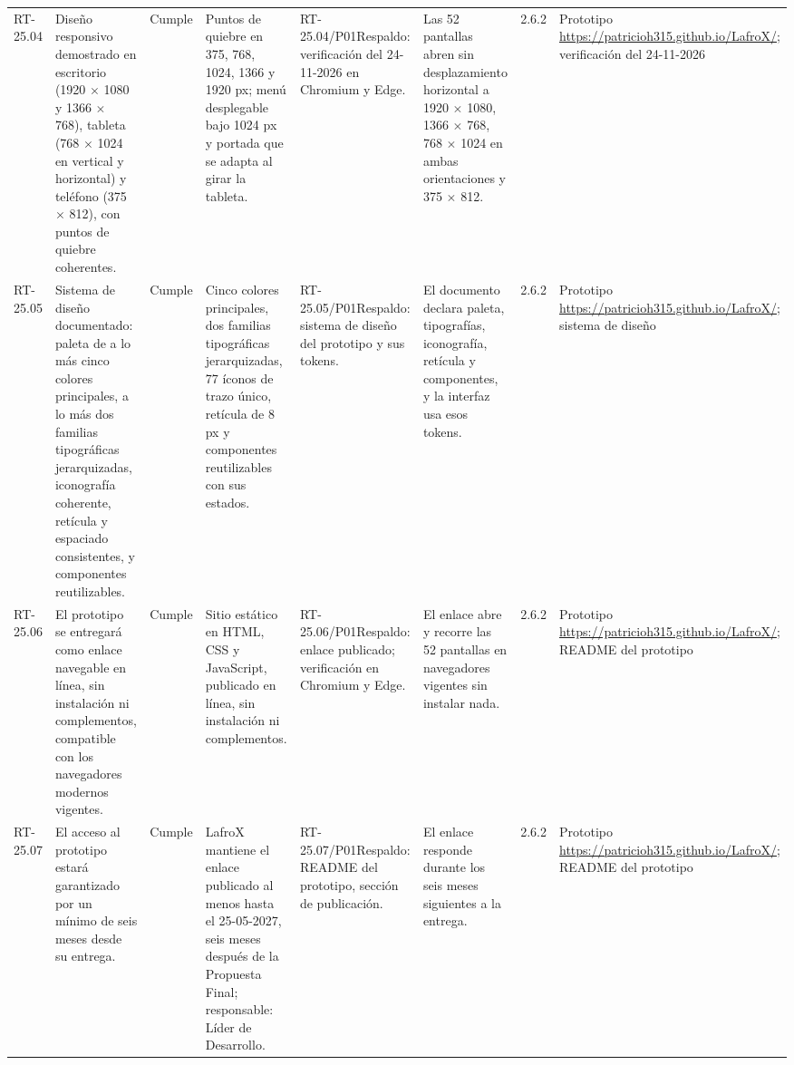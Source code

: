 \documentclass[oficio,firma,final]{lafrox}
\begin{document}
\begin{landscape}
{\begin{longtable}{@{}F{0.054} F{0.173} F{0.061} F{0.191} F{0.106} F{0.180} F{0.067} F{0.168}@{}}
  RT-25.04 & Diseño responsivo demostrado en escritorio (1920 $\times$ 1080 y 1366 $\times$ 768), tableta (768 $\times$ 1024 en vertical y horizontal) y teléfono (375 $\times$ 812), con puntos de quiebre coherentes. & Cumple & Puntos de quiebre en 375, 768, 1024, 1366 y 1920 px; menú desplegable bajo 1024 px y portada que se adapta al girar la tableta. & RT-25.04/\allowbreak{}P01\newline Respaldo: verificación del 24-11-2026 en Chromium y Edge. & Las 52 pantallas abren sin desplazamiento horizontal a 1920 $\times$ 1080, 1366 $\times$ 768, 768 $\times$ 1024 en ambas orientaciones y 375 $\times$ 812. & 2.6.2 & Prototipo \url{https://patricioh315.github.io/LafroX/}; verificación del 24-11-2026  \\
  RT-25.05 & Sistema de diseño documentado: paleta de a lo más cinco colores principales, a lo más dos familias tipográficas jerarquizadas, iconografía coherente, retícula y espaciado consistentes, y componentes reutilizables. & Cumple & Cinco colores principales, dos familias tipográficas jerarquizadas, 77 íconos de trazo único, retícula de 8 px y componentes reutilizables con sus estados. & RT-25.05/\allowbreak{}P01\newline Respaldo: sistema de diseño del prototipo y sus tokens. & El documento declara paleta, tipografías, iconografía, retícula y componentes, y la interfaz usa esos tokens. & 2.6.2 & Prototipo \url{https://patricioh315.github.io/LafroX/}; sistema de diseño  \\
  RT-25.06 & El prototipo se entregará como enlace navegable en línea, sin instalación ni complementos, compatible con los navegadores modernos vigentes. & Cumple & Sitio estático en HTML, CSS y JavaScript, publicado en línea, sin instalación ni complementos. & RT-25.06/\allowbreak{}P01\newline Respaldo: enlace publicado; verificación en Chromium y Edge. & El enlace abre y recorre las 52 pantallas en navegadores vigentes sin instalar nada. & 2.6.2 & Prototipo \url{https://patricioh315.github.io/LafroX/}; README del prototipo  \\
  RT-25.07 & El acceso al prototipo estará garantizado por un mínimo de seis meses desde su entrega. & Cumple & LafroX mantiene el enlace publicado al menos hasta el 25-05-2027, seis meses después de la Propuesta Final; responsable: Líder de Desarrollo. & RT-25.07/\allowbreak{}P01\newline Respaldo: README del prototipo, sección de publicación. & El enlace responde durante los seis meses siguientes a la entrega. & 2.6.2 & Prototipo \url{https://patricioh315.github.io/LafroX/}; README del prototipo  \\

\end{longtable}}
\end{landscape}
\end{document}
